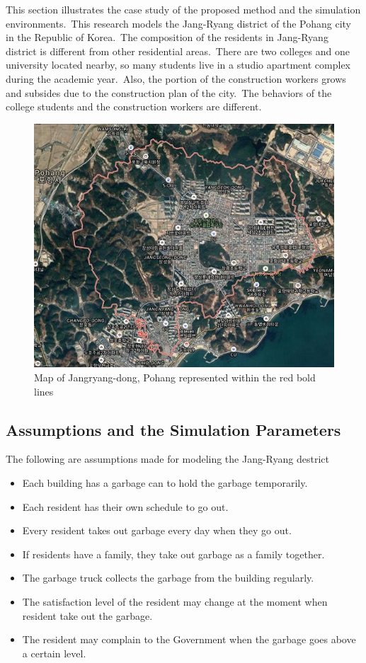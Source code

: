 \documentclass{scsSimAUDPaperFormat}
\begin{document}
This section illustrates the case study of the proposed method and the simulation environments.~This research models the Jang-Ryang district of the Pohang city in the Republic of Korea.~The composition of the residents in Jang-Ryang district is different from other residential areas.~There are two colleges and one university located nearby, so many students live in a studio apartment complex during the academic year.~Also, the portion of the construction workers grows and subsides due to the construction plan of the city.~The behaviors of the college students and the construction workers are different. 
\begin{figure}[!ht]
    \centering
    \includegraphics[width=1.0\columnwidth]{fig/map.jpg}
    \caption{Map of Jangryang-dong, Pohang represented within the red bold lines}
    \label{Fig:JangYrang}
\end{figure}
\subsection{Assumptions and the Simulation Parameters}
The following are assumptions made for modeling the  Jang-Ryang destrict
\begin{itemize}
    \item Each building has a garbage can to hold the garbage temporarily.
    \item Each resident has their own schedule to go out.
    \item Every resident takes out garbage every day when they go out. 
    \item If residents have a family, they take out garbage as a family together.
    \item The garbage truck collects the garbage from the building regularly.
    \item The satisfaction level of the resident may change at the moment when resident take out the garbage.
    \item The resident may complain to the Government when the garbage goes above a certain level.
\end{itemize}
\end{document}
